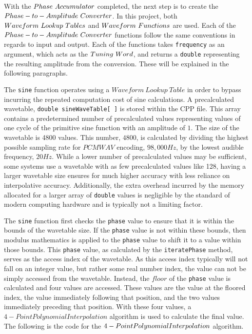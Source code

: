 \documentclass[a4paper,12pt]{report}
\begin{document}
With the $Phase\ \-Accumulator$ completed, the next step is to create the $Phase-to-Amplitude\ \-Converter$. In this project, both $Waveform\ \-Lookup\ \-Tables$ and $Waveform\ \-Functions$ are used. Each of the $Phase-to-Amplitude\ \-Converter$ functions follow the same conventions in regards to input and output. Each of the functions takes \texttt{frequency} as an argument, which acts as the $Tuning\ \-Word$, and returns a \texttt{double} representing the resulting amplitude from the conversion. These will be explained in the following paragraphs.

The \texttt{sine} function operates using a $Waveform\ Lookup\ Table$ in order to bypass incurring the repeated computation cost of sine calculations. A precalculated wavetable, \texttt{double sine\-Wave\-Table[ ]} is stored within the CPP file. This array contains a predetermined number of precalculated values representing values of one cycle of the primitive sine function with an amplitude of $1$. The size of the wavetable is 4800 values. This number, $4800$, is calculated by dividing the highest possible sampling rate for $PCM WAV$ encoding, $98,000Hz$, by the lowest audible frequency, $20Hz$. While a lower number of precalculated values may be sufficient, some systems use a wavetable with as few precalculated values like 128, having a larger wavetable size ensures for much higher accuracy with less reliance on interpolative accuracy. Additionally, the extra overhead incurred by the memory allocated for a larger array of \texttt{double} values is negligible by the standard of modern computing hardware and is typically not a limiting factor.

The \texttt{sine} function first checks the \texttt{phase} value to ensure that it is within the bounds of the wavetable size. If the \texttt{phase} value is not within these bounds, then modulus mathematics is applied to the \texttt{phase} value to shift it to a value within those bounds. This \texttt{phase} value, as calculated by the \texttt{iterate\-Phase} method, serves as the access index of the wavetable. As this access index typically will not fall on an integer value, but rather some real number index, the value can not be simply accessed from the wavetable. Instead, the $floor$ of the \texttt{phase} value is calculated and four values are accessed. These values are the value at the floored index, the value immediately following that position, and the two values immediately preceding that position. With these four values, a $4-Point Polynomial Interpolation$ algorithm is used to calculate the final value. The following is the code for the $4-Point \-Polynomial \-Interpolation$ algorithm.
\end{document}
